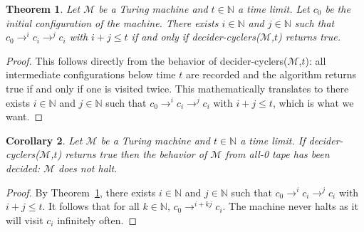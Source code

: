 \documentclass[a4paper,british]{article}
\newtheorem{theorem}{Theorem}
\newtheorem{corollary}[theorem]{Corollary}
\begin{document}
\begin{theorem}\label{th:main}\normalfont Let $\mathcal{M}$ be a Turing machine and $t \in \mathbb{N}$ a time limit. Let $c_0$ be the initial configuration of the machine. There exists $i\in\mathbb{N}$ and $j\in\mathbb{N}$ such that $c_0 \to^i c_i \to^j c_i$ with $i+j \leq t$ if and only if {\sc decider-cyclers}($\mathcal{M}$,$t$) returns true.
\end{theorem}
\begin{proof}
        This follows directly from the behavior of {\sc decider-cyclers}($\mathcal{M}$,$t$): all intermediate configurations below time $t$ are recorded and the algorithm returns true if and only if one is visited twice. This mathematically translates to
        there exists $i\in\mathbb{N}$ and $j\in\mathbb{N}$ such that $c_0 \to^i c_i \to^j c_i$ with $i+j \leq t$, which is what we want.
\end{proof}

\begin{corollary}\normalfont
        Let $\mathcal{M}$ be a Turing machine and $t \in \mathbb{N}$ a time limit. If {\sc decider-cyclers}($\mathcal{M}$,$t$) returns true then the behavior of $\mathcal{M}$ from all-0 tape has been decided: $\mathcal{M}$ does not halt.
\end{corollary}
\begin{proof}
        By Theorem~\ref{th:main}, there exists $i\in\mathbb{N}$ and $j\in\mathbb{N}$ such that $c_0 \to^i c_i \to^j c_i$ with $i+j \leq t$. It follows that for all $k\in\mathbb{N}$, $c_0 \to^{i+kj} c_i$. The machine never halts as it will visit $c_i$ infinitely often.
\end{proof}
\end{document}
